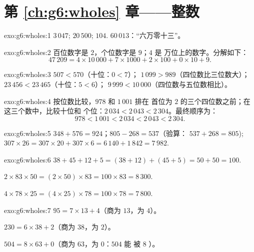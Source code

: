 \section*{第 \ref{ch:g6:wholes} 章——整数}

\begin{solution}{exo:g6:wholes:1}
$3\,047$; \quad $20\,500$; \quad $104$. \quad
$60\,013$：“六万零十三”。
\end{solution}

\begin{solution}{exo:g6:wholes:2}
百位数字是 $2$，个位数字是 $9$；$4$ 是
万位上的数字。分解如下：
\[
47\,209 = 4 \times 10\,000 + 7 \times 1000 + 2 \times 100 + 0 \times 10
+ 9 .
\]
\end{solution}

\begin{solution}{exo:g6:wholes:3}
$507 < 570$（十位：$0 < 7$）；\quad
$1\,099 > 989$（四位数比三位数大）；\quad
$23\,456 < 23\,465$（十位：$5 < 6$）；\quad
$9\,999 < 10\,000$（四位数与五位数相比）。
\end{solution}

\begin{solution}{exo:g6:wholes:4}
按位数比较，$978$ 和 $1\,001$ 排在
首位为 $2$ 的三个四位数之前；在这三个数中，比较十位和
个位：$2\,034 < 2\,043 < 2\,304$。最终顺序为：
\[
978 < 1\,001 < 2\,034 < 2\,043 < 2\,304 .
\]
\end{solution}

\begin{solution}{exo:g6:wholes:5}
$348 + 576 = 924$；\quad $805 - 268 = 537$（验算：
$537 + 268 = 805$); \quad $307 \times 26 = 307 \times 20 + 307 \times 6
= 6\,140 + 1\,842 = 7\,982$.
\end{solution}

\begin{solution}{exo:g6:wholes:6}
$38 + 45 + 12 + 5 = (38 + 12) + (45 + 5) = 50 + 50 = 100$.

$2 \times 83 \times 50 = (2 \times 50) \times 83 = 100 \times 83 =
8\,300$.

$4 \times 78 \times 25 = (4 \times 25) \times 78 = 100 \times 78 =
7\,800$.
\end{solution}

\begin{solution}{exo:g6:wholes:7}
$95 = 7 \times 13 + 4$（商为 $13$，为 $4$）。

$230 = 6 \times 38 + 2$（商为 $38$，为 $2$）。

$504 = 8 \times 63 + 0$（商为 $63$，为 $0$：$504$ 能
被 $8$ ）。
\end{solution}

